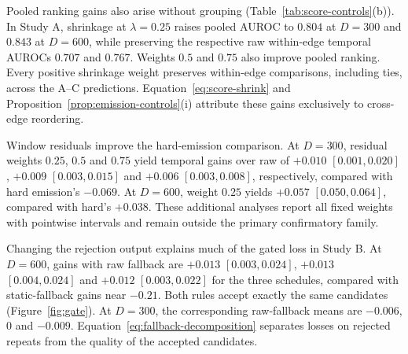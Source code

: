 \begin{samepage}
Pooled ranking gains also arise without grouping (Table~\ref{tab:score-controls}(b)).
In Study A, shrinkage at $\lambda=0.25$ raises pooled AUROC to $0.804$
at $D=300$ and $0.843$ at $D=600$, while preserving the respective raw
within-edge temporal AUROCs $0.707$ and $0.767$. Weights $0.5$ and
$0.75$ also improve pooled ranking. Every positive shrinkage weight preserves
within-edge comparisons, including ties, across the A--C predictions.
Equation~\eqref{eq:score-shrink} and Proposition~\ref{prop:emission-controls}(i)
attribute these gains exclusively to cross-edge reordering.\par
\end{samepage}

Window residuals improve the hard-emission comparison. At $D=300$, residual
weights $0.25$, $0.5$ and $0.75$ yield temporal gains over raw of $+0.010$
$[0.001,0.020]$, $+0.009$ $[0.003,0.015]$ and $+0.006$
$[0.003,0.008]$, respectively, compared with hard emission's $-0.069$.
At $D=600$, weight $0.25$ yields $+0.057$ $[0.050,0.064]$, compared
with hard's $+0.038$. These additional analyses report all fixed weights
with pointwise intervals and remain outside the primary confirmatory family.

Changing the rejection output explains much of the gated loss in Study B.
At $D=600$, gains with raw fallback are $+0.013$ $[0.003,0.024]$,
$+0.013$ $[0.004,0.024]$ and $+0.012$ $[0.003,0.022]$ for the
three schedules, compared with static-fallback gains near $-0.21$.
Both rules accept exactly the same candidates (Figure~\ref{fig:gate}). At $D=300$, the corresponding
raw-fallback means are $-0.006$, $0$ and $-0.009$.
Equation~\eqref{eq:fallback-decomposition} separates losses on rejected
repeats from the quality of the accepted candidates.
